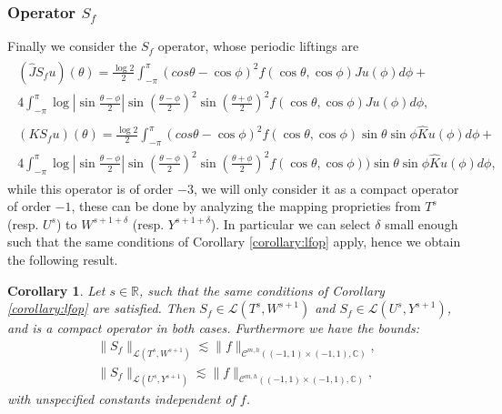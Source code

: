 \documentclass{article}
\newtheorem{corollary}[theorem]{Corollary}
\newcommand{\IC}{{\mathbb C}}
\newcommand{\IR}{{\mathbb R}}
\newcommand{\cmspaceh}[4]{\mathcal{C}^{#1,#2} \left( #3, #4 \right)}
\newcommand{\iinterv}{(-1,1)\times(-1,1)}
\begin{document}
\subsubsection{Operator $S_f$}

Finally we consider the $S_f$ operator, whose periodic liftings are 
\begin{align*}
\begin{split}
(\widehat{J}S_fu)(\theta) = \frac{\log 2}{2}\int_{-\pi}^\pi
(cos \theta - \cos \phi)^2 f(\cos \theta, \cos \phi)Ju(\phi) d\phi +\\
4 \int_{-\pi}^\pi \log \left\vert \sin \frac{\theta-\phi}{2} \right\vert \sin\left( \frac{\theta-\phi}{2} \right)^2
\sin\left( \frac{\theta+\phi}{2} \right)^2 f(\cos \theta, \cos \phi) Ju (\phi) d \phi, 
\end{split} \\
\begin{split}
(K S_fu)(\theta) = \frac{\log 2}{2}\int_{-\pi}^\pi
(cos \theta - \cos \phi)^2 f(\cos \theta, \cos \phi)\sin \theta \sin \phi \widehat{K}u(\phi) d\phi +\\
4 \int_{-\pi}^\pi \log \left\vert \sin \frac{\theta-\phi}{2} \right\vert \sin\left( \frac{\theta-\phi}{2} \right)^2
\sin\left( \frac{\theta+\phi}{2} \right)^2 f(\cos \theta, \cos \phi) )\sin \theta \sin \phi \widehat{K}u (\phi) d \phi, 
\end{split} 
\end{align*}
while this operator is of order $-3$, we will only consider it as a compact operator of order $-1$, these can be done by analyzing the mapping proprieties from $T^s$ (resp. $U^s$) to $W^{s+1+\delta}$ (resp. $Y^{s+1+\delta}$). In particular we can select $\delta$ small enough such that the same conditions of Corollary \ref{corollary:lfop} apply, hence we obtain the following result. 

\begin{corollary}
\label{corollary:sfop}
Let $s \in \IR$, such that the same conditions of Corollary \ref{corollary:lfop} are satisfied. Then
 $ S_f  \in \mathcal{L}(T^{s},W^{s+1})$ and  $S_f  \in \mathcal{L}(U^{s},Y^{s+1})$, and is a compact operator in both cases. Furthermore we have the bounds: 
\begin{align*}
\| S_f\|_{ \mathcal{L}(T^{s},W^{s+1})} \lesssim \|f\|_{\cmspaceh{m}{h}{\iinterv}{\IC}},\\
\| S_f\|_{ \mathcal{L}(U^{s},Y^{s+1})} \lesssim \|f\|_{\cmspaceh{m}{h}{\iinterv}{\IC}},
\end{align*}
with unspecified constants independent of $f$.
\end{corollary}
\end{document}
